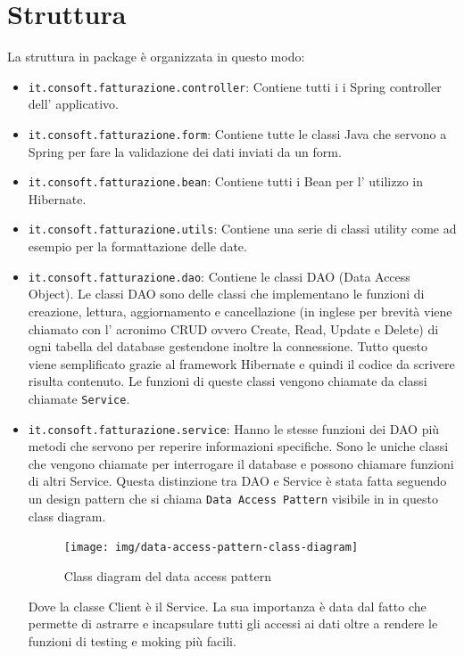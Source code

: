 \documentclass[12pt]{book}
\begin{document}
\section{Struttura}
La struttura in package è organizzata in questo modo:
\begin{itemize}
    \item \texttt{it.consoft.fatturazione.controller}: Contiene tutti i 
        i Spring controller dell' applicativo.
    \item \texttt{it.consoft.fatturazione.form}: Contiene tutte le classi Java 
        che servono a Spring per fare la validazione dei dati inviati da un 
        form\@. 
    \item \texttt{it.consoft.fatturazione.bean}: Contiene tutti i Bean per 
        l' utilizzo in Hibernate.     
    \item \texttt{it.consoft.fatturazione.utils}: Contiene una serie di classi
        utility come ad esempio per la formattazione delle date.
    \item \texttt{it.consoft.fatturazione.dao}: Contiene le classi DAO (Data
        Access Object). Le classi DAO sono delle classi che implementano 
        le funzioni di creazione, lettura, aggiornamento e cancellazione 
        (in inglese per brevità viene chiamato con l' acronimo CRUD ovvero
        Create, Read, Update e Delete) di ogni 
        tabella del database gestendone inoltre la connessione. 
        Tutto questo viene semplificato grazie al framework Hibernate e quindi 
        il codice da scrivere risulta contenuto.
        Le funzioni di queste classi vengono chiamate da classi chiamate 
        \texttt{Service}.
    \item \texttt{it.consoft.fatturazione.service}:         
        Hanno le stesse funzioni dei DAO più metodi che servono per 
        reperire informazioni specifiche.
        Sono le uniche classi che vengono chiamate per 
        interrogare il database e possono chiamare funzioni di altri
        Service.
        Questa distinzione tra DAO e Service è stata fatta seguendo un 
        design pattern che si chiama \texttt{Data Access Pattern} visibile in  
        in questo class diagram.
        \begin{figure}[H]
            \centering
            \texttt{[image: img/data-access-pattern-class-diagram]}
            \caption{Class diagram del data access pattern}\label{pattern:dao}
        \end{figure}
        Dove la classe Client è il Service. 
        La sua importanza è data dal fatto che permette  
        di astrarre e incapsulare tutti gli accessi ai dati oltre a rendere
        le funzioni di testing e moking più facili.
\end{itemize}
\end{document}
